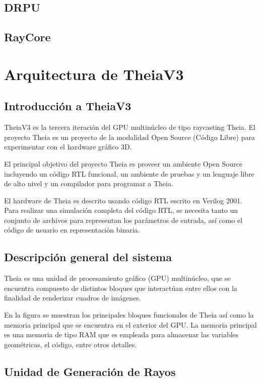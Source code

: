 \subsection{DRPU}
\subsection{RayCore}

\section{Arquitectura de TheiaV3}
\subsection{Introducción a TheiaV3}
TheiaV3 es la tercera iteración del GPU multinúcleo de tipo raycasting Theia. El proyecto Theia es un proyecto de la modalidad Open Source (Código Libre) para experimentar con el hardware gráfico 3D.

El principal objetivo del proyecto Theia es proveer un ambiente Open Source incluyendo un código RTL funcional, un ambiente de pruebas y un lenguaje libre de alto nivel y un compilador para programar a Theia.

El hardware de Theia es descrito usando código RTL escrito en Verilog 2001. Para realizar una simulación completa del código RTL, se necesita tanto un conjunto de archivos para representan los parámetros de entrada, así como el código de usuario en representación binaria.  

\subsection{Descripción general del sistema}

Theia es una unidad de procesamiento gráfico (GPU) multinúcleo, que se encuentra compuesto de distintos bloques que interactúan entre ellos con la finalidad de renderizar cuadros de imágenes.

En la figura se muestran los principales bloques funcionales de Theia así como la memoria principal que se encuentra en el exterior del GPU. La memoria principal es una memoria de tipo RAM que es empleada para almacenar las variables geométricas, el código, entre otros detalles.

\subsection{Unidad de Generación de Rayos}

